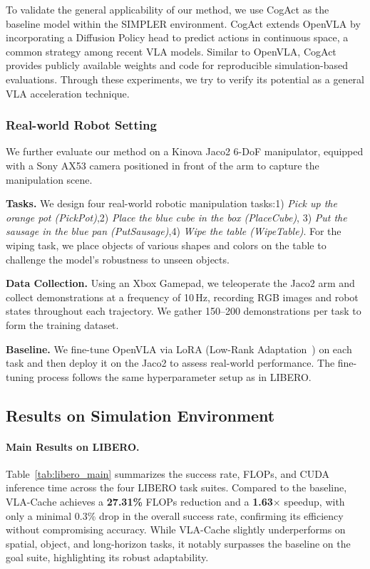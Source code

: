 To validate the general applicability of our method, we use CogAct as the baseline model within the SIMPLER environment. CogAct extends OpenVLA by incorporating a Diffusion Policy head to predict actions in continuous space, a common strategy among recent VLA models. Similar to OpenVLA, CogAct provides publicly available weights and code for reproducible simulation-based evaluations. Through these experiments, we try to verify its potential as a general VLA acceleration technique.


\subsubsection{Real-world Robot Setting}
We further evaluate our method on a Kinova Jaco2 6-DoF manipulator, equipped with a Sony AX53 camera positioned in front of the arm to capture the manipulation scene.

\textbf{Tasks.}
We design four real-world robotic manipulation tasks:1) \emph{Pick up the orange pot (PickPot)},2) \emph{Place the blue cube in the box (PlaceCube)}, 3) \emph{Put the sausage in the blue pan (PutSausage)},4) \emph{Wipe the table (WipeTable)}.
For the wiping task, we place objects of various shapes and colors on the table to challenge the model's robustness to unseen objects.

\textbf{Data Collection.}
Using an Xbox Gamepad, we teleoperate the Jaco2 arm and collect demonstrations at a frequency of 10\,Hz, recording RGB images and robot states throughout each trajectory. We gather 150--200 demonstrations per task to form the training dataset.

\textbf{Baseline.}
We fine-tune OpenVLA via LoRA (Low-Rank Adaptation~\cite{hu2021lora}) on each task and then deploy it on the Jaco2 to assess real-world performance. The fine-tuning process follows the same hyperparameter setup as in LIBERO.

\subsection{Results on Simulation Environment}





\paragraph{Main Results on LIBERO.}
Table~\ref{tab:libero_main} summarizes the success rate, FLOPs, and CUDA inference time across the four LIBERO task suites. Compared to the baseline, VLA-Cache achieves a \textbf{27.31\%} FLOPs reduction and a \textbf{1.63$\times$} speedup, with only a minimal 0.3\% drop in the overall success rate, confirming its efficiency without compromising accuracy. While VLA-Cache slightly underperforms on spatial, object, and long-horizon tasks, it notably surpasses the baseline on the goal suite, highlighting its robust adaptability.

